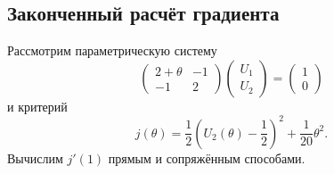 \subsection{Законченный расчёт градиента}

\begin{problem}
Рассмотрим параметрическую систему
\begin{equation}
\label{eq:worked-parametric-system-v06}
 \begin{pmatrix}
 2+\theta&-1\\
 -1&2
 \end{pmatrix}
 \begin{pmatrix}
 U_1\\U_2
 \end{pmatrix}
 =
 \begin{pmatrix}
 1\\0
 \end{pmatrix}
\end{equation}
и критерий
\begin{equation}
\label{eq:worked-objective-v06}
 j(\theta)
 =
 \frac12\left(U_2(\theta)-\frac12\right)^2
 +
 \frac{1}{20}\theta^2.
\end{equation}
Вычислим $j'(1)$ прямым и сопряжённым способами.
\end{problem}


